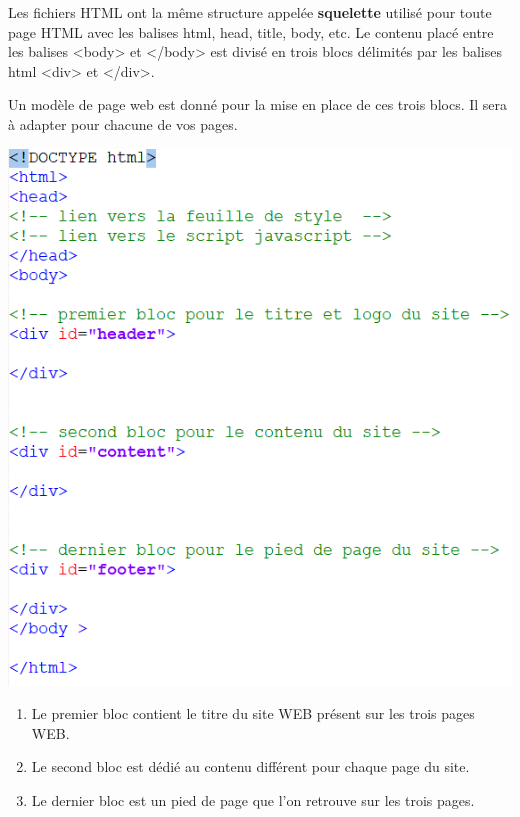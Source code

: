 \documentclass[11pt]{article}
\providecommand{\tightlist}{%
      \setlength{\itemsep}{0pt}\setlength{\parskip}{0pt}}
\begin{document}
Les fichiers HTML ont la même structure appelée \textbf{squelette}
utilisé pour toute page HTML avec les balises html, head, title, body,
etc. Le contenu placé entre les balises \textless body\textgreater{} et
\textless/body\textgreater{} est divisé en trois blocs délimités par les
balises html \textless div\textgreater{} et \textless/div\textgreater.

Un modèle de page web est donné pour la mise en place de ces trois
blocs. Il sera à adapter pour chacune de vos pages.

\begin{center}
\includegraphics[scale=0.8]{img/squelette_page.png}
\end{center}

\begin{enumerate}
\def\labelenumi{\arabic{enumi}.}
\tightlist
\item
  Le premier bloc contient le titre du site WEB présent sur les trois
  pages WEB.
\item
  Le second bloc est dédié au contenu différent pour chaque page du
  site.
\item
  Le dernier bloc est un pied de page que l'on retrouve sur les trois
  pages.
\end{enumerate}
\end{document}
